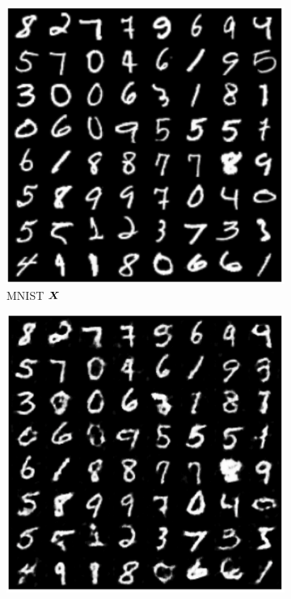 \documentclass[../../book-main.tex]{subfiles}
\begin{document}
\begin{figure}[t]
    \begin{subfigure}[t]{0.20\textwidth}
        \centering
        \includegraphics[width=\textwidth]{chapters/chapter5/figs/mnist_x.png}
        \caption{MNIST $\bm{X}$}
    \end{subfigure}
    \hfill
    \begin{subfigure}[t]{0.20\textwidth}
        \centering
        \includegraphics[width=\textwidth]{chapters/chapter5/figs/mnist_recon_x.png}

\end{subfigure}
\end{figure}
\end{document}
